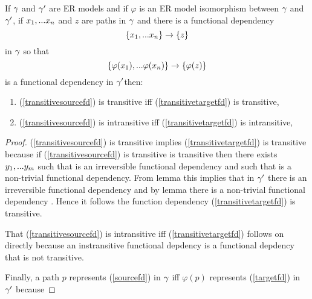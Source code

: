 \begin{lemma}
If $\gamma$ and $\gamma'$ are ER models and  if  $\varphi$ is an ER model isomorphism between $\gamma$  and $\gamma'$,  if $x_1,...x_n$ and $z$ are paths in $\gamma$
and there is a  functional dependency
\begin{equation}
\label{transitivesourcefd}
\left\{x_1,...x_n\right\} \rightarrow \left\{z\right\}
\end{equation} 
in $\gamma$
so that
\begin{equation}
\label{transitivetargetfd}
\left\{\varphi(x_1),...\varphi(x_n)\right\} \rightarrow \left\{\varphi(z)\right\}
\end{equation}
is a functional dependency in $\gamma'$then:
\begin{enumerate}
\item (\ref{transitivesourcefd}) is  transitive iff (\ref{transitivetargetfd}) is transitive, 
\item (\ref{transitivesourcefd}) is  intransitive iff (\ref{transitivetargetfd}) is intransitive,

\end{enumerate}
\end{lemma}
\begin{proof}
\vspace{0.5cm}
(\ref{transitivesourcefd}) is transitive implies (\ref{transitivetargetfd}) 
is transitive because if (\ref{transitivesourcefd}) is transitive is transitive then
there exists $y_1,...y_m$ such that
\fd{\xn}{\ym} is an irreversible functional dependency
and such that  is a non-trivial functional dependency.
From lemma  this implies that in $\gamma'$ there is an 
\fd{\phixn}{\phiym} irreversible functional dependency \fd{\phixn}{\phiym}
and by lemma  there is a non-trivial functional dependency \fd{\phiym}{\phiz}. Hence it follows
the function dependency (\ref{transitivetargetfd}) is transitive.

That (\ref{transitivesourcefd}) is  intransitive iff (\ref{transitivetargetfd}) follows on directly because an instransitive functional depdency is a functional depdency that is not transitive.

Finally, a path $p$ represents (\ref{sourcefd}) in $\gamma$ iff $\varphi(p)$ represents (\ref{targetfd}) in $\gamma'$
because

\end{proof}

